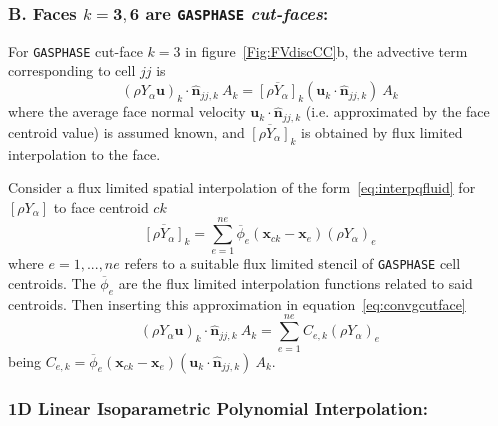 \documentclass[12pt]{article}
\begin{document}
\subsubsection*{B. Faces $k=\mathbf{3},\mathbf{6}$ are \texttt{GASPHASE} \textit{cut-faces}:}

For \texttt{GASPHASE} cut-face $k=3$ in figure~\ref{Fig:FVdiscCC}b, the advective term corresponding to cell $jj$ is
%
\begin{equation}
  \left( \rho Y_\alpha \mathbf{u} \right)_k \cdot \hat{\mathbf{n}}_{jj,k} \: A_k = \overline{[\rho Y_\alpha]}_k \left( \mathbf{u}_k \cdot \hat{\mathbf{n}}_{jj,k} \right) \: A_k \label{eq:convgcutface}
\end{equation}
%
where the average face normal velocity $\mathbf{u}_k \cdot \hat{\mathbf{n}}_{jj,k} $ (i.e. approximated by the face centroid value) is assumed known, and $\overline{[\rho Y_\alpha]}_k$ is obtained by flux limited interpolation to the face. 

Consider a flux limited spatial interpolation of the form~\eqref{eq:interpqfluid} for $[\rho Y_\alpha]$ to face centroid $ck$
%
\begin{equation}
  \overline{[\rho Y_\alpha]}_k = \sum^{ne}_{e=1} \overline{\phi}_e(\mathbf{x}_{ck}-\mathbf{x}_e) \left( \rho Y_{\alpha} \right)_e
\end{equation}
% 
where $e=1,...,ne$ refers to a suitable flux limited stencil of \texttt{GASPHASE} cell centroids. The $\overline{\phi}_e$ are the flux limited interpolation functions  related to said centroids. Then inserting this approximation in equation~\eqref{eq:convgcutface}
%
\begin{equation}
  \left( \rho Y_\alpha \mathbf{u} \right)_k \cdot \hat{\mathbf{n}}_{jj,k} \: A_k = \sum^{ne}_{e=1}  C_{e,k} \left( \rho Y_{\alpha} \right)_e
\end{equation}
being $C_{e,k}=\overline{\phi}_e(\mathbf{x}_{ck}-\mathbf{x}_e) \left( \mathbf{u}_k \cdot \hat{\mathbf{n}}_{jj,k} \right) \: A_k$.


\subsubsection*{1D Linear Isoparametric Polynomial Interpolation:}
\end{document}
